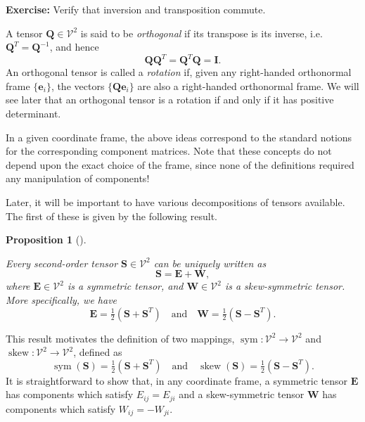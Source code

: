 \documentclass[
  letterpaper,
  DIV=11,
  numbers=noendperiod]{scrreprt}
\theoremstyle{plain}
\newtheorem{proposition}{Proposition}[chapter]
\theoremstyle{remark}
\begin{document}
\textbf{Exercise:} Verify that inversion and transposition commute.

A tensor \({\boldsymbol{Q}}\in{\mathcal{V}}^2\) is said to be
\emph{orthogonal} if its transpose is its inverse,
i.e.~\({\boldsymbol{Q}}^T = {\boldsymbol{Q}}^{-1}\), and hence
\[{\boldsymbol{Q}}{\boldsymbol{Q}}^T = {\boldsymbol{Q}}^T{\boldsymbol{Q}}= {\boldsymbol{I}}.\]
An orthogonal tensor is called a \emph{rotation} if, given any
right-handed orthonormal frame \(\{{\boldsymbol{e}}_i\}\), the vectors
\(\{{\boldsymbol{Q}}{\boldsymbol{e}}_i\}\) are also a right-handed
orthonormal frame. We will see later that an orthogonal tensor is a
rotation if and only if it has positive determinant.

In a given coordinate frame, the above ideas correspond to the standard
notions for the corresponding component matrices. Note that these
concepts do not depend upon the exact choice of the frame, since none of
the definitions required any manipulation of components!

Later, it will be important to have various decompositions of tensors
available. The first of these is given by the following result.

\begin{proposition}[]\protect\hypertarget{prp-symdecomp}{}\label{prp-symdecomp}

Every second-order tensor \({\boldsymbol{S}}\in{\mathcal{V}}^2\) can be
uniquely written as
\[{\boldsymbol{S}}= {\boldsymbol{E}}+ {\boldsymbol{W}},\] where
\({\boldsymbol{E}}\in{\mathcal{V}}^2\) is a symmetric tensor, and
\({\boldsymbol{W}}\in{\mathcal{V}}^2\) is a skew-symmetric tensor. More
specifically, we have
\[{\boldsymbol{E}}= \tfrac12({\boldsymbol{S}}+{\boldsymbol{S}}^T)\quad\text{and}\quad{\boldsymbol{W}}= \tfrac12({\boldsymbol{S}}-{\boldsymbol{S}}^T).\]

\end{proposition}

This result motivates the definition of two mappings,
\({\operatorname{sym}}:{\mathcal{V}}^2\to{\mathcal{V}}^2\) and
\({\operatorname{skew}}:{\mathcal{V}}^2\to{\mathcal{V}}^2\), defined as
\[{\operatorname{sym}}({\boldsymbol{S}}) = \tfrac12({\boldsymbol{S}}+{\boldsymbol{S}}^T)\quad\text{and}\quad{\operatorname{skew}}({\boldsymbol{S}})=\tfrac12({\boldsymbol{S}}-{\boldsymbol{S}}^T).\]
It is straightforward to show that, in any coordinate frame, a symmetric
tensor \({\boldsymbol{E}}\) has components which satisfy
\(E_{ij}=E_{ji}\) and a skew-symmetric tensor \({\boldsymbol{W}}\) has
components which satisfy \(W_{ij}=-W_{ji}\).
\end{document}

